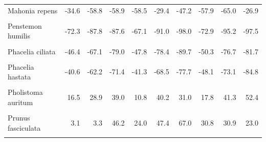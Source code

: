 \begin{longtable}[t]{lrrrrrrrrr}
\addlinespace
Mahonia repens & -34.6 & -58.8 & -58.9 & -58.5 & -29.4 & -47.2 & -57.9 & -65.0 & -26.9\\
\cellcolor{gray!10}{Nemophila menziesii} & \cellcolor{gray!10}{23.7} & \cellcolor{gray!10}{19.6} & \cellcolor{gray!10}{26.3} & \cellcolor{gray!10}{11.0} & \cellcolor{gray!10}{20.4} & \cellcolor{gray!10}{26.9} & \cellcolor{gray!10}{12.1} & \cellcolor{gray!10}{20.3} & \cellcolor{gray!10}{5.6}\\
Penstemon humilis & -72.3 & -87.8 & -87.6 & -67.1 & -91.0 & -98.0 & -72.9 & -95.2 & -97.5\\
\cellcolor{gray!10}{Phacelia cicutaria} & \cellcolor{gray!10}{54.8} & \cellcolor{gray!10}{77.9} & \cellcolor{gray!10}{120.2} & \cellcolor{gray!10}{39.4} & \cellcolor{gray!10}{101.3} & \cellcolor{gray!10}{103.4} & \cellcolor{gray!10}{40.5} & \cellcolor{gray!10}{91.5} & \cellcolor{gray!10}{104.7}\\
Phacelia ciliata & -46.4 & -67.1 & -79.0 & -47.8 & -78.4 & -89.7 & -50.3 & -76.7 & -81.7\\
\addlinespace
\cellcolor{gray!10}{Phacelia distans} & \cellcolor{gray!10}{26.0} & \cellcolor{gray!10}{46.3} & \cellcolor{gray!10}{72.0} & \cellcolor{gray!10}{28.3} & \cellcolor{gray!10}{72.0} & \cellcolor{gray!10}{98.7} & \cellcolor{gray!10}{33.9} & \cellcolor{gray!10}{69.6} & \cellcolor{gray!10}{79.2}\\
Phacelia hastata & -40.6 & -62.2 & -71.4 & -41.3 & -68.5 & -77.7 & -48.1 & -73.1 & -84.8\\
\cellcolor{gray!10}{Phacelia heterophylla} & \cellcolor{gray!10}{-10.0} & \cellcolor{gray!10}{-19.4} & \cellcolor{gray!10}{-24.6} & \cellcolor{gray!10}{-8.9} & \cellcolor{gray!10}{-16.8} & \cellcolor{gray!10}{-45.5} & \cellcolor{gray!10}{-12.3} & \cellcolor{gray!10}{-27.6} & \cellcolor{gray!10}{-47.3}\\
Pholistoma auritum & 16.5 & 28.9 & 39.0 & 10.8 & 40.2 & 31.0 & 17.8 & 41.3 & 52.4\\
\cellcolor{gray!10}{Potentilla tilingii} & \cellcolor{gray!10}{9.1} & \cellcolor{gray!10}{5.7} & \cellcolor{gray!10}{0.0} & \cellcolor{gray!10}{8.5} & \cellcolor{gray!10}{-0.8} & \cellcolor{gray!10}{-18.7} & \cellcolor{gray!10}{17.4} & \cellcolor{gray!10}{-8.1} & \cellcolor{gray!10}{-5.0}\\
\addlinespace
Prunus fasciculata & 3.1 & 3.3 & 46.2 & 24.0 & 47.4 & 67.0 & 30.8 & 30.9 & 23.0\\
\cellcolor{gray!10}{Prunus ilicifolia} & \cellcolor{gray!10}{34.5} & \cellcolor{gray!10}{28.6} & \cellcolor{gray!10}{30.9} & \cellcolor{gray!10}{27.2} & \cellcolor{gray!10}{36.4} & \cellcolor{gray!10}{26.7} & \cellcolor{gray!10}{33.8} & \cellcolor{gray!10}{31.1} & \cellcolor{gray!10}{12.7}\\

\end{longtable}
